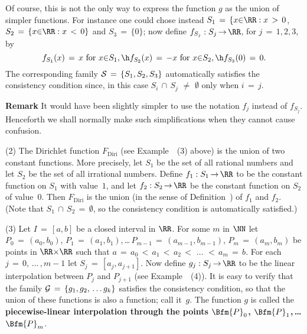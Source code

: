         Of course, this is not the only way to express the function $g$ as the union of simpler functions.
    For instance one could chose instead $S_{1} \,=\, \{x{\in}{\RR}: x\,>\,0$, $S_{2} \,=\, \{x{\in}{\RR}: x\,<\,0\}$ and $S_{3} \,=\, \{0\}$;
    now define $f_{S_{j}}:S_{j} \,{\rightarrow}\, {\RR}$, for $j \,=\, 1,2,3$, by
        \begin{displaymath}
        f_{S_{1}}(x) \,=\,  x \mbox{ for $x{\in}S_{1}$}, \h
        f_{S_{2}}(x) \,=\, -x \mbox{ for $x{\in}S_{2}$}, \h
        f_{S_{3}}(0) \,=\, 0.
        \end{displaymath}
    The corresponding family ${\cal S} \,=\, \{S_{1}, S_{2}, S_{3}\}$ automatically satisfies the consistency condition since,
    in this case $S_{i}\,{\cap}\,S_{j} \,\,{\neq}\,\, {\emptyset}$ only when $i \,=\, j$.

        {\bf Remark} It would have been slightly simpler to use the notation $f_{j}$ instead of $f_{S_{j}}$.
    Henceforth we shall normally make such simplifications when they cannot cause confusion.

\V


        (2) The Dirichlet function $F_{\mbox{Diri}}$ (see Example~~(3) above) is the union of two constant functions.
    More precisely, let $S_{1}$ be the set of all rational numbers and let $S_{2}$ be the set of all irrational numbers.
    Define $f_{1}:S_{1} \,{\rightarrow}\, {\RR}$ to be the constant function on $S_{1}$ with value~$1$,
    and let $f_{2}:S_{2} \,{\rightarrow}\, {\RR}$ be the constant function on $S_{2}$ of value~$0$.
    Then $F_{\mbox{Diri}}$ is the union (in the sense of Definition~) of $f_{1}$ and $f_{2}$.
    (Note that $S_{1}\,{\cap}\,S_{2} \,=\, {\emptyset}$, so the consistency condition is automatically satisfied.)

\V

        (3) Let $I \,=\, [a,b]$ be a closed interval in ${\RR}$. For some $m$ in ${\NN}$ let
    $P_{0} \,=\, (a_{0},b_{0})$, $P_{1} \,=\, (a_{1},b_{1})$,\,{\ldots}\,$P_{m-1} \,=\, (a_{m-1},b_{m-1})$, $P_{m} \,=\, (a_{m},b_{m})$
    be points in ${\RR}{\times}{\RR}$ such that  $a \,=\, a_{0}\,<\,a_{1}\,<\,a_{2}\,<\,\,{\ldots}\,\,<\,a_{m} \,=\, b$.
    For each $j \,=\, 0,\,{\ldots}\,,m-1$ let $S_{j} \,=\, [a_{j},a_{j+1}]$.
    Now define $g_{j}:S_{j} \,{\rightarrow}\, {\RR}$ to be the linear interpolation between $P_{j}$ and $P_{j+1}$ (see Example~~(4)).
    It is easy to verify that the family ${\cal G} \,=\, \{g_{1},g_{2},\,{\ldots}\,g_{k}\}$ satisfies the consistency condition, so that the union of these functions is also a function; call it~$g$.
    The function $g$ is called the {\bf piecewise-linear interpolation
through the points $\Bfm{P}_{0}$, $\Bfm{P}_{1}$,\,{\ldots}\,$\Bfm{P}_{m}$}.

